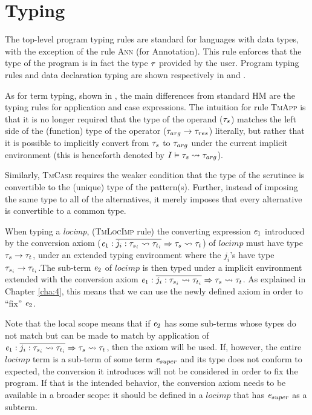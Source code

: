 \section{Typing}
The top-level program typing rules are standard for languages with data types, with the exception of the rule \textsc{Ann} (for Annotation). This rule enforces that the type of the program is in fact the type $\mathit{\tau}$ provided by the user. Program typing rules and data declaration typing are shown respectively in  and .

As for term typing, shown in , the main differences from standard HM are the typing rules for application and case expressions. The intuition for rule \textsc{TmApp} is that it is no longer required that the type of the operand ($\mathit{\tau}_s$) matches the left side of the (function) type of the operator ($\mathit{\tau}_{arg} \to \mathit{\tau}_{res}$) literally, but rather that it is possible to implicitly convert from $\mathit{\tau}_s$ to $\mathit{\tau}_{arg}$ under the current implicit environment (this is henceforth denoted by ${I} \vDash {\mathit{\tau}_s}\rightsquigarrow {\mathit{\tau}_{arg}}$).

Similarly, \textsc{TmCase} requires the weaker condition that the type of the scrutinee is convertible to the (unique) type of the pattern(s). Further, instead of imposing the same type to all of the alternatives, it merely imposes that every alternative is convertible to a common type.

When typing a \textit{locimp}, (\textsc{TmLocImp} rule) the converting expression $\mathit{e}_{1}$ introduced by the conversion axiom ($ \mathit{e}_{1} : \overline{j_i : \mathit{\tau}_{s_i} \rightsquigarrow \mathit{\tau}_{t_i}} \Rightarrow \mathit{\tau}_{s} \rightsquigarrow \mathit{\tau}_{t}$) of $locimp$ must have type $\mathit{\tau}_{s} \to \mathit{\tau}_{t}$, under an extended typing environment where the $j_i$'s have type $\mathit{\tau}_{s_i} \to \mathit{\tau}_{t_i}$.The sub-term $\mathit{e}_2$ of $locimp$ is then typed under a implicit environment extended with the conversion axiom $ \mathit{e}_{1} : \overline{j_i : \mathit{\tau}_{s_i} \rightsquigarrow \mathit{\tau}_{t_i}} \Rightarrow \mathit{\tau}_{s} \rightsquigarrow \mathit{\tau}_{t}$. As explained in Chapter \ref{cha:4}, this means that we can use the newly defined axiom in order to ``fix'' $\mathit{e}_2$.

Note that the local scope means that if $\mathit{e}_2$ has some sub-terms whose types do not match but can be made to match by application of $ \mathit{e}_{1} : \overline{j_i : \mathit{\tau}_{s_i} \rightsquigarrow \mathit{\tau}_{t_i}} \Rightarrow \mathit{\tau}_{s} \rightsquigarrow \mathit{\tau}_{t}$, then the axiom will be used. If, however, the entire $locimp$ term is a sub-term of some term $\mathit{e}_{super}$ and its type does not conform to expected, the conversion it introduces will not be considered in order to fix the program. If that is the intended behavior, the conversion axiom needs to be available in a broader scope: it should be defined in a $locimp$ that has $\mathit{e}_{super}$ as a subterm.

